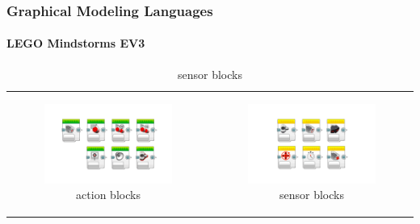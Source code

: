\documentclass[11 pt,t]{beamer}
\begin{document}
\begin{frame}
\vspace{-1.4cm}
  \frametitle{Graphical Modeling Languages}
  \framesubtitle{LEGO Mindstorms EV3}
    \begin{table}[h!]
    \begin{center}
      \begin{tabular}{cc}
      
      \begin{subfigure}{0.5\textwidth}\centering\includegraphics[width=\textwidth]{images/LearnToProgram_action_blocks_landscape.png}\caption{action blocks}\end{subfigure}&
      \begin{subfigure}{0.5\textwidth}\centering\includegraphics[width=\textwidth]{images/LearnToProgram_sensor_blocks_landscape.png}\caption{sensor blocks}\end{subfigure}\\


\end{tabular}
\end{center}
\end{table}
\end{frame}
\end{document}
